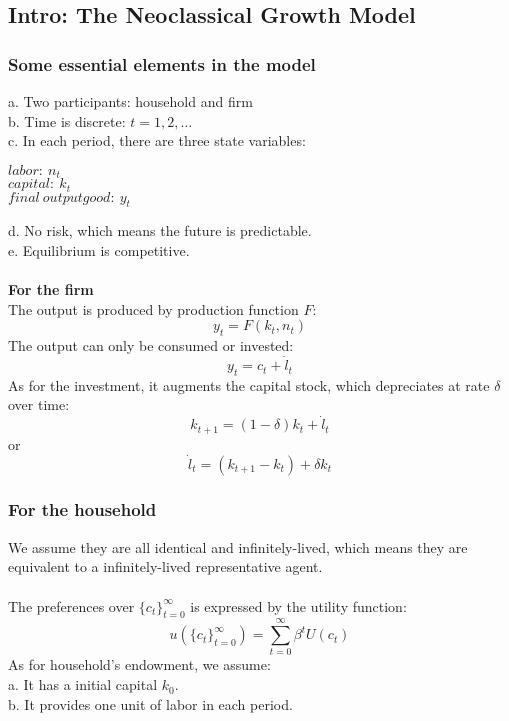 \documentclass{article}
\begin{document}
\subsection{Intro: The Neoclassical Growth Model}
\subsubsection{Some essential elements in the model}
\indent \indent a. Two participants: household and firm\\
\indent b. Time is discrete: $t = 1, 2, \ldots$\\
\indent c. In each period, there are three state variables:
\begin{center}
	$labor :\ n_t$\\
	$capital :\ k_t$\\
	$final\ output good : \ y_t$
\end{center}

\indent d. No risk, which means the future is predictable.\\
\indent e. Equilibrium is competitive.\\\\
\textbf{For the firm}\\
The output is produced by production function $F$:
\begin{equation*}
	y_t = F(k_t, n_t)
\end{equation*}
The output can only be consumed or invested:
\begin{equation*}
	y_t = c_t + \dot{l}_t
\end{equation*}
As for the investment, it augments the capital stock, which depreciates at rate $\delta$ over time:
\begin{equation*}
	k_{t+1} = (1 - \delta)k_t + \dot{l}_t
\end{equation*}
or
\begin{equation*}
	\dot{l}_t = (k_{t+1} - k_t) + \delta k_t
\end{equation*}

\subsubsection{For the household}
We assume they are all identical and infinitely-lived, which means they are equivalent to a infinitely-lived representative agent.\\\\
The preferences over $\{c_t\}^\infty_{t=0}$ is expressed by the utility function:
\begin{equation*}
	u(\{c_t\}^\infty_{t=0}) = \sum\limits^\infty_{t=0} \beta^t U(c_t)
\end{equation*}
As for household's endowment, we assume:\\
\indent a. It has a initial capital $k_0$.\\
\indent b. It provides one unit of labor in each period.
\end{document}
